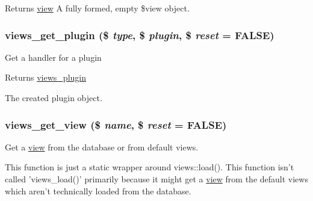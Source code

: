 \begin{DoxyReturn}{Returns}
\hyperlink{classview}{view} A fully formed, empty \$view object. 
\end{DoxyReturn}
\hypertarget{views_8module_a6989c2c815b1afa01fa3f29841497ba1}{
\subsubsection[{views\_\-get\_\-plugin}]{\setlength{\rightskip}{0pt plus 5cm}views\_\-get\_\-plugin (\$ {\em type}, \/  \$ {\em plugin}, \/  \$ {\em reset} = {\ttfamily FALSE})}}
\label{views_8module_a6989c2c815b1afa01fa3f29841497ba1}
Get a handler for a plugin

\begin{DoxyReturn}{Returns}
\hyperlink{classviews__plugin}{views\_\-plugin}
\end{DoxyReturn}
The created plugin object. \hypertarget{views_8module_add8b65aa3fa72b8a6f89e5ff314e42c0}{
\subsubsection[{views\_\-get\_\-view}]{\setlength{\rightskip}{0pt plus 5cm}views\_\-get\_\-view (\$ {\em name}, \/  \$ {\em reset} = {\ttfamily FALSE})}}
\label{views_8module_add8b65aa3fa72b8a6f89e5ff314e42c0}
Get a \hyperlink{classview}{view} from the database or from default views.

This function is just a static wrapper around views::load(). This function isn't called 'views\_\-load()' primarily because it might get a \hyperlink{classview}{view} from the default views which aren't technically loaded from the database.


